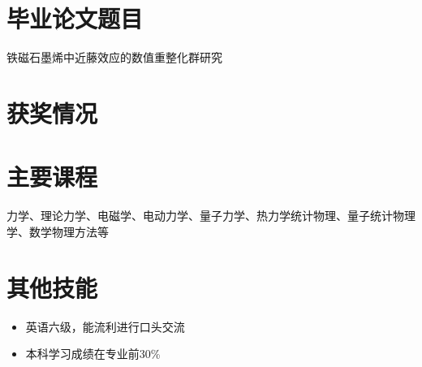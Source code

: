 \documentclass{resume}
\begin{document}
\section{毕业论文题目}
铁磁石墨烯中近藤效应的数值重整化群研究

\section{获奖情况}

\section{主要课程}
力学、理论力学、电磁学、电动力学、量子力学、热力学统计物理、量子统计物理学、数学物理方法等

\section{其他技能}
\begin{itemize}%
\item 英语六级，能流利进行口头交流
\item 本科学习成绩在专业前30\%
\end{itemize}



%  
\end{document}
